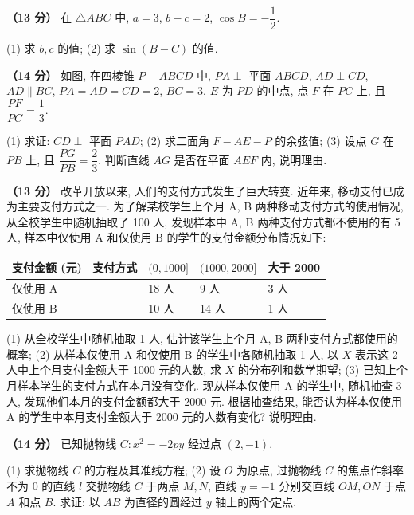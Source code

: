 \begin{question}
\textbf{（13 分）} 
在 $\triangle ABC$ 中, $a = 3$, $b - c = 2$, $\cos B = -\dfrac{1}{2}$.

(1) 求 $b, c$ 的值;  
(2) 求 $\sin (B - C)$ 的值.

\Needspace{0.4\textheight}
\end{question}
\begin{question}
\textbf{（14 分）} 
如图, 在四棱锥 $P - ABCD$ 中, $PA \perp$ 平面 $ABCD$, $AD \perp CD$, $AD \parallel BC$, $PA = AD = CD = 2$, $BC = 3$. $E$ 为 $PD$ 的中点, 点 $F$ 在 $PC$ 上, 且 $\dfrac{PF}{PC} = \dfrac{1}{3}$.
\nopagebreak[4]
\begin{center}\end{center}
\nopagebreak[4]
(1) 求证: $CD \perp$ 平面 $PAD$;  
(2) 求二面角 $F - AE - P$ 的余弦值;  
(3) 设点 $G$ 在 $PB$ 上, 且 $\dfrac{PG}{PB} = \dfrac{2}{3}$. 判断直线 $AG$ 是否在平面 $AEF$ 内, 说明理由.

\end{question}
\begin{question}
\textbf{（13 分）} 
改革开放以来, 人们的支付方式发生了巨大转变. 近年来, 移动支付已成为主要支付方式之一. 为了解某校学生上个月 A, B 两种移动支付方式的使用情况, 从全校学生中随机抽取了 100 人, 发现样本中 A, B 两种支付方式都不使用的有 5 人, 样本中仅使用 A 和仅使用 B 的学生的支付金额分布情况如下:

\begin{center}
\begin{tabular}{llll}
\toprule
支付金额 (元) \ 支付方式 & $(0, 1000]$ & $(1000, 2000]$ & 大于 2000 \\
\midrule
仅使用 A & 18 人 & 9 人 & 3 人 \\
仅使用 B & 10 人 & 14 人 & 1 人 \\
\bottomrule
\end{tabular}
\end{center}

(1) 从全校学生中随机抽取 1 人, 估计该学生上个月 A, B 两种支付方式都使用的概率;  
(2) 从样本仅使用 A 和仅使用 B 的学生中各随机抽取 1 人, 以 $X$ 表示这 2 人中上个月支付金额大于 1000 元的人数, 求 $X$ 的分布列和数学期望;  
(3) 已知上个月样本学生的支付方式在本月没有变化. 现从样本仅使用 A 的学生中, 随机抽查 3 人, 发现他们本月的支付金额都大于 2000 元. 根据抽查结果, 能否认为样本仅使用 A 的学生中本月支付金额大于 2000 元的人数有变化? 说明理由.

\end{question}
\begin{question}
\textbf{（14 分）} 
已知抛物线 $C: x^2 = -2py$ 经过点 $(2, -1)$.

(1) 求抛物线 $C$ 的方程及其准线方程;  
(2) 设 $O$ 为原点, 过抛物线 $C$ 的焦点作斜率不为 0 的直线 $l$ 交抛物线 $C$ 于两点 $M, N$, 直线 $y = -1$ 分别交直线 $OM, ON$ 于点 $A$ 和点 $B$. 求证: 以 $AB$ 为直径的圆经过 $y$ 轴上的两个定点.

\end{question}
